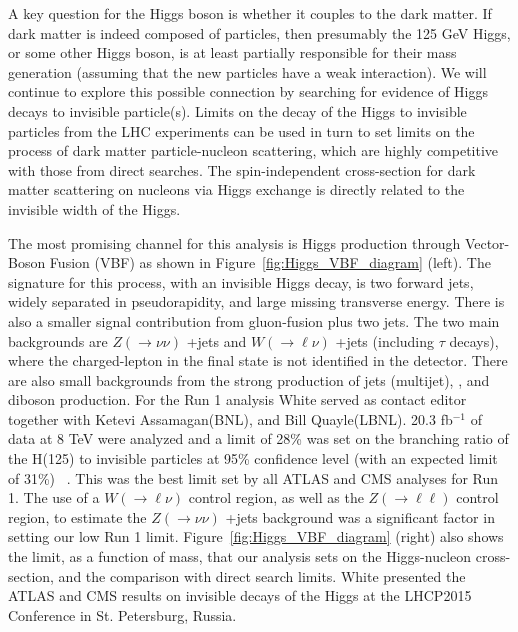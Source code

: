 A key question for the Higgs boson is whether it couples to the dark matter. 
If dark matter is indeed composed of particles, then presumably the 
125 GeV Higgs, or some other Higgs boson, is at least partially responsible 
for their mass generation (assuming that the new particles have a weak interaction).
We will continue to explore this possible connection by 
searching for evidence of Higgs decays to invisible particle(s).
Limits on the decay of the Higgs to invisible particles from the LHC experiments can be used in turn to set limits
on the process of dark matter particle-nucleon scattering, which are highly competitive with those from direct searches. 
The spin-independent cross-section for dark matter scattering on nucleons via Higgs exchange is directly related to the
invisible width of the Higgs.


The most promising channel for this analysis is Higgs production through Vector-Boson Fusion (VBF) 
as shown in Figure~\ref{fig:Higgs_VBF_diagram} (left). The signature for this process, with an invisible Higgs decay, 
is two forward jets, widely separated in pseudorapidity, and large missing transverse energy.
There is also a smaller signal contribution from gluon-fusion plus two jets.
The two main backgrounds are  $Z (\rightarrow \nu\nu)$ +jets and $W (\rightarrow \ell\nu) $ +jets (including $ \tau $ decays), 
where the charged-lepton in the final state is not identified in the detector. There are also
small backgrounds from the strong production of jets (multijet), \ttbar, and diboson production.
For the Run 1 analysis White served as contact editor together with Ketevi Assamagan(BNL), and Bill Quayle(LBNL). 
20.3 fb$^{-1}$ of data at 8 TeV were analyzed and a limit of 28\% was set on the branching ratio of the H(125) to
 invisible particles at 95\% confidence level (with an expected limit of 31\%) ~\cite{HinvRun1}. This was the best limit set 
by all ATLAS and CMS analyses for Run 1. The use of a $W(\rightarrow \ell\nu) $ control region, as well as the
$Z (\rightarrow \ell\ell) $ control region, to estimate the $Z (\rightarrow \nu\nu) $ +jets background was a 
significant factor in setting our low Run 1 limit. Figure~\ref{fig:Higgs_VBF_diagram} (right) also shows the limit, as a function of mass, 
that our analysis sets on the Higgs-nucleon cross-section, and the comparison with direct search limits. 
White presented the ATLAS and CMS results on invisible decays of the Higgs at the LHCP2015 Conference in St. Petersburg, Russia. ~\cite{LHCP2015}

